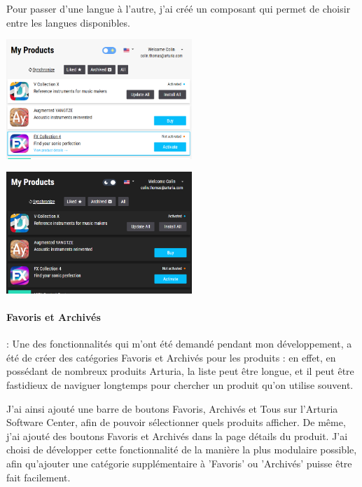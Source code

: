 \documentclass[francais]{rapportPFE}  %
\begin{document}
Pour passer d'une langue à l'autre, j'ai créé un composant qui permet de choisir entre les langues disponibles.

\begin{center}
    \centering
    \begin{minipage}{.5\textwidth}
    \centering
    \includegraphics[width=7cm]{graphics/daymode.png}
    \label{fig:test1}
    \end{minipage}%
    \begin{minipage}{.5\textwidth}
    \centering
    \includegraphics[width=7cm]{graphics/darkmode.png}
    \label{fig:test2}
    \end{minipage}
    \end{center}


\paragraph{Favoris et Archivés}: Une des fonctionnalités qui m'ont été demandé pendant mon développement, a été de créer des catégories Favoris et Archivés pour les produits : en effet, en possédant de nombreux produits Arturia, la liste peut être longue, et il peut être fastidieux de naviguer longtemps pour chercher un produit qu'on utilise souvent.

J'ai ainsi ajouté une barre de boutons Favoris, Archivés et Tous sur l'Arturia Software Center, afin de pouvoir sélectionner quels produits afficher.
De même, j'ai ajouté des boutons Favoris et Archivés dans la page détails du produit. 
J'ai choisi de développer cette fonctionnalité de la manière la plus modulaire possible, afin qu'ajouter une catégorie supplémentaire à 'Favoris' ou 'Archivés' puisse être fait facilement.
\end{document}
